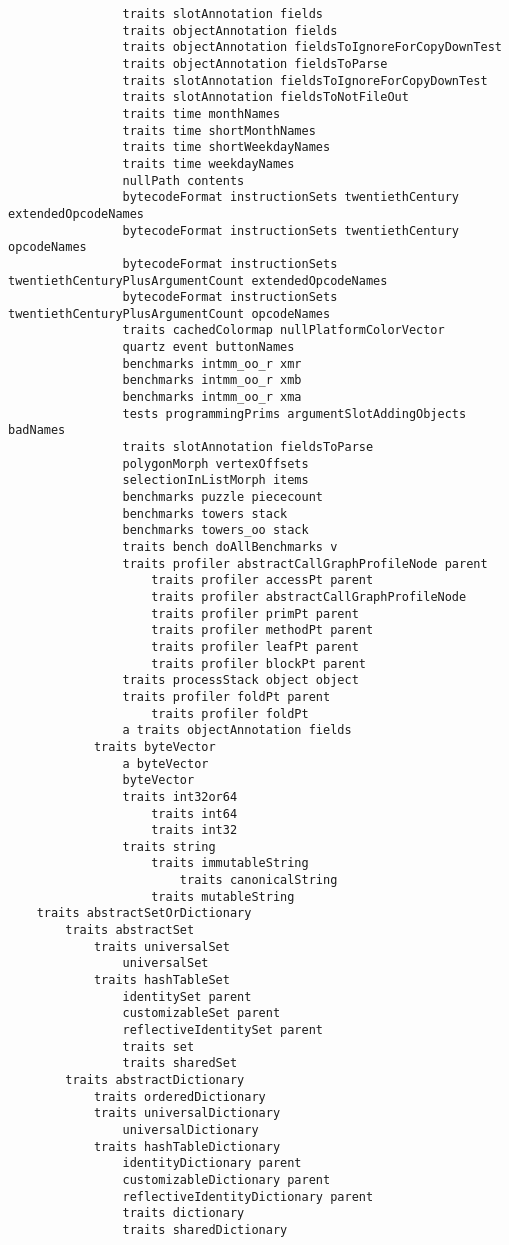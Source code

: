 \documentclass[10pt]{article}
\begin{document}
\begin{multicols*}{3}
\begin{lstlisting}
                traits slotAnnotation fields
                traits objectAnnotation fields
                traits objectAnnotation fieldsToIgnoreForCopyDownTest
                traits objectAnnotation fieldsToParse
                traits slotAnnotation fieldsToIgnoreForCopyDownTest
                traits slotAnnotation fieldsToNotFileOut
                traits time monthNames
                traits time shortMonthNames
                traits time shortWeekdayNames
                traits time weekdayNames
                nullPath contents
                bytecodeFormat instructionSets twentiethCentury extendedOpcodeNames
                bytecodeFormat instructionSets twentiethCentury opcodeNames
                bytecodeFormat instructionSets twentiethCenturyPlusArgumentCount extendedOpcodeNames
                bytecodeFormat instructionSets twentiethCenturyPlusArgumentCount opcodeNames
                traits cachedColormap nullPlatformColorVector
                quartz event buttonNames
                benchmarks intmm_oo_r xmr
                benchmarks intmm_oo_r xmb
                benchmarks intmm_oo_r xma
                tests programmingPrims argumentSlotAddingObjects badNames
                traits slotAnnotation fieldsToParse
                polygonMorph vertexOffsets
                selectionInListMorph items
                benchmarks puzzle piececount
                benchmarks towers stack
                benchmarks towers_oo stack
                traits bench doAllBenchmarks v
                traits profiler abstractCallGraphProfileNode parent
                    traits profiler accessPt parent
                    traits profiler abstractCallGraphProfileNode
                    traits profiler primPt parent
                    traits profiler methodPt parent
                    traits profiler leafPt parent
                    traits profiler blockPt parent
                traits processStack object object
                traits profiler foldPt parent
                    traits profiler foldPt
                a traits objectAnnotation fields
            traits byteVector
                a byteVector
                byteVector
                traits int32or64
                    traits int64
                    traits int32
                traits string
                    traits immutableString
                        traits canonicalString
                    traits mutableString
    traits abstractSetOrDictionary
        traits abstractSet
            traits universalSet
                universalSet
            traits hashTableSet
                identitySet parent
                customizableSet parent
                reflectiveIdentitySet parent
                traits set
                traits sharedSet
        traits abstractDictionary
            traits orderedDictionary
            traits universalDictionary
                universalDictionary
            traits hashTableDictionary
                identityDictionary parent
                customizableDictionary parent
                reflectiveIdentityDictionary parent
                traits dictionary
                traits sharedDictionary
\end{lstlisting}


\end{multicols*}
\end{document}
